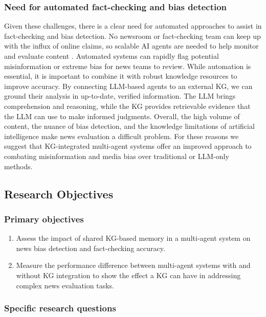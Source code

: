 \documentclass[11pt]{article}
\begin{document}
\subsubsection{Need for automated fact-checking and bias detection}
Given these challenges, there is a clear need for automated approaches to assist in fact-checking and bias detection. No newsroom or fact-checking team can keep up with the influx of online claims, so scalable AI agents are needed to help monitor and evaluate content \cite{r12}. Automated systems can rapidly flag potential misinformation or extreme bias for news teams to review. While automation is essential, it is important to combine it with robust knowledge resources to improve accuracy. By connecting LLM-based agents to an external KG, we can ground their analysis in up-to-date, verified information. The LLM brings comprehension and reasoning, while the KG provides retrievable evidence that the LLM can use to make informed judgments.
Overall, the high volume of content, the nuance of bias detection, and the knowledge limitations of artificial intelligence make news evaluation a difficult problem. For these reasons we suggest that KG-integrated multi-agent systems offer an improved approach to combating misinformation and media bias over traditional or LLM-only methods.  



\subsection{Research Objectives}
\subsubsection{Primary objectives}

\begin{enumerate}
    \item Assess the impact of shared KG-based memory in a multi-agent system on news bias detection and fact-checking accuracy.

    \item Measure the performance difference between multi-agent systems with and without KG integration to show the effect a KG can have in addressing complex news evaluation tasks.
\end{enumerate}

\subsubsection{Specific research questions}
\end{document}
